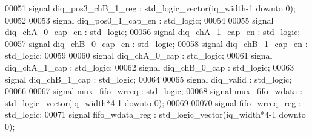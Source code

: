 \begin{DoxyCode}
00051 \textcolor{keywordflow}{signal} \textcolor{vhdlchar}{diq_pos3_chB_1_reg}  \textcolor{vhdlchar}{:} \textcolor{comment}{std\_logic\_vector}\textcolor{vhdlchar}{(}\textcolor{vhdlchar}{iq_width}\textcolor{vhdlchar}{-}\textcolor{vhdllogic}{}\textcolor{vhdllogic}{1} \textcolor{keywordflow}{downto} \textcolor{vhdllogic}{}\textcolor{vhdllogic}{0}\textcolor{vhdlchar}{)};
00052 
00053 \textcolor{keywordflow}{signal} \textcolor{vhdlchar}{diq_pos0_1_cap_en}    \textcolor{vhdlchar}{:} \textcolor{comment}{std\_logic};
00054 
00055 \textcolor{keywordflow}{signal} \textcolor{vhdlchar}{diq_chA_0_cap_en}    \textcolor{vhdlchar}{:} \textcolor{comment}{std\_logic};
00056 \textcolor{keywordflow}{signal} \textcolor{vhdlchar}{diq_chA_1_cap_en}    \textcolor{vhdlchar}{:} \textcolor{comment}{std\_logic};
00057 \textcolor{keywordflow}{signal} \textcolor{vhdlchar}{diq_chB_0_cap_en}    \textcolor{vhdlchar}{:} \textcolor{comment}{std\_logic};
00058 \textcolor{keywordflow}{signal} \textcolor{vhdlchar}{diq_chB_1_cap_en}    \textcolor{vhdlchar}{:} \textcolor{comment}{std\_logic};
00059 
00060 \textcolor{keywordflow}{signal} \textcolor{vhdlchar}{diq_chA_0_cap}       \textcolor{vhdlchar}{:} \textcolor{comment}{std\_logic};
00061 \textcolor{keywordflow}{signal} \textcolor{vhdlchar}{diq_chA_1_cap}       \textcolor{vhdlchar}{:} \textcolor{comment}{std\_logic};
00062 \textcolor{keywordflow}{signal} \textcolor{vhdlchar}{diq_chB_0_cap}       \textcolor{vhdlchar}{:} \textcolor{comment}{std\_logic};
00063 \textcolor{keywordflow}{signal} \textcolor{vhdlchar}{diq_chB_1_cap}       \textcolor{vhdlchar}{:} \textcolor{comment}{std\_logic};
00064 
00065 \textcolor{keywordflow}{signal} \textcolor{vhdlchar}{diq_valid}              \textcolor{vhdlchar}{:} \textcolor{comment}{std\_logic};
00066 
00067 \textcolor{keywordflow}{signal} \textcolor{vhdlchar}{mux_fifo_wrreq}      \textcolor{vhdlchar}{:} \textcolor{comment}{std\_logic};
00068 \textcolor{keywordflow}{signal} \textcolor{vhdlchar}{mux_fifo_wdata}      \textcolor{vhdlchar}{:} \textcolor{comment}{std\_logic\_vector}\textcolor{vhdlchar}{(}\textcolor{vhdlchar}{iq_width}\textcolor{vhdlchar}{*}\textcolor{vhdllogic}{4-1} \textcolor{keywordflow}{downto} \textcolor{vhdllogic}{}\textcolor{vhdllogic}{0}\textcolor{vhdlchar}{)};
00069 
00070 \textcolor{keywordflow}{signal} \textcolor{vhdlchar}{fifo_wrreq_reg}      \textcolor{vhdlchar}{:} \textcolor{comment}{std\_logic};
00071 \textcolor{keywordflow}{signal} \textcolor{vhdlchar}{fifo_wdata_reg}      \textcolor{vhdlchar}{:} \textcolor{comment}{std\_logic\_vector}\textcolor{vhdlchar}{(}\textcolor{vhdlchar}{iq_width}\textcolor{vhdlchar}{*}\textcolor{vhdllogic}{4-1} \textcolor{keywordflow}{downto} \textcolor{vhdllogic}{}\textcolor{vhdllogic}{0}\textcolor{vhdlchar}{)};

\end{DoxyCode}
